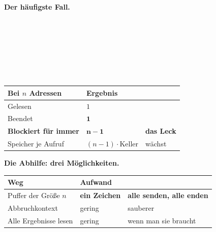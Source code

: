\begin{merksatz}
\textbf{Der häufigste Fall.}

\begin{center}
\begin{minipage}{0.9\textwidth}
\\
\\
\\
\\
\code{\ \ \ \ \}}\\
\\
\code{\}}
\end{minipage}
\end{center}

\begin{center}
\renewcommand{\arraystretch}{1.45}
\begin{tabular}{@{}P{2.8cm}P{2.2cm}P{2.8cm}@{}}
\toprule
\textbf{Bei $n$ Adressen} & \textbf{Ergebnis} & \\
\midrule
Gelesen & $1$ & \\
Beendet & $\mathbf{1}$ & \\
\textbf{Blockiert für immer} & $\mathbf{n-1}$ & \textcolor{akzent}{\textbf{das Leck}}\\
Speicher je Aufruf & \textcolor{akzent}{$(n{-}1)\cdot$Keller} & \textcolor{akzent}{wächst}\\
\bottomrule
\end{tabular}
\end{center}

\begin{center}
\begin{minipage}{0.88\textwidth}
\end{minipage}
\end{center}

\textbf{Die Abhilfe: drei Möglichkeiten.}

\begin{center}
\renewcommand{\arraystretch}{1.5}
\begin{tabular}{@{}P{3.0cm}P{2.2cm}P{2.8cm}@{}}
\toprule
\textbf{Weg} & \textbf{Aufwand} & \\
\midrule
Puffer der Größe $n$ & \textcolor{gruen}{\textbf{ein Zeichen}} & \textbf{alle senden, alle enden}\\
Abbruchkontext & gering & \textcolor{gruen}{sauberer}\\
Alle Ergebnisse lesen & gering & wenn man sie braucht\\
\bottomrule
\end{tabular}
\end{center}


\end{merksatz}
